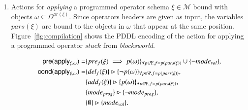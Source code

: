 \begin{itemize}
\begin{enumerate}
\item Actions for {\em applying} a programmed operator schema $\xi\in\mathcal{M}$ bound with objects $\omega\subseteq\Omega^{ar(\xi)}$. Since operators headers are given as input, the variables $pars(\xi)$ are bound to the objects in $\omega$ that appear at the same position. Figure~\ref{fig:compilation} shows the PDDL encoding of the action for applying a programmed operator $stack$ from {\em blocksworld}.
\begin{small}
\begin{align*}
\hspace*{7pt}\mathsf{pre}(\mathsf{apply_{\xi,\omega}})=&\{pre_{f}(\xi)\implies p(\omega)\}_{\forall p\in\Psi,f=p(pars(\xi))}\cup \{\neg mode_{val}\},\\
\mathsf{cond}(\mathsf{apply_{\xi,\omega}})=&\{del_{f}(\xi)\}\rhd\{\neg p(\omega)\}_{\forall p\in\Psi,f=p(pars(\xi))},\\
&\{add_{f}(\xi)\}\rhd\{p(\omega)\}_{\forall p\in\Psi,f=p(pars(\xi))},\\
&\{mode_{prog}\}\rhd\{\neg mode_{prog}\},\\
&\{\emptyset\}\rhd\{mode_{val}\}.
\end{align*}
\end{small}


\end{enumerate}
\end{itemize}
